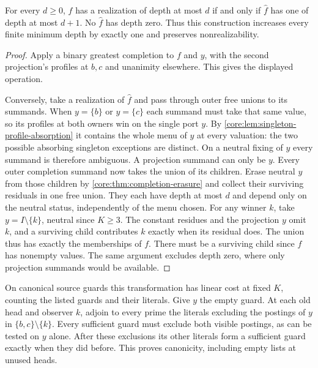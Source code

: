 \begin{theorem}\label{core:thm:completion-suspension}
For every $d\ge0$, $f$ has a realization of depth at most $d$ if and
only if $\widehat f$ has one of depth at most $d+1$.
No $\widehat f$ has depth zero. Thus this construction increases every
finite minimum depth by exactly one and preserves nonrealizability.
\end{theorem}
\begin{proof}
Apply a binary greatest completion to $f$ and $y$, with the second
projection's profiles at $b,c$ and unanimity elsewhere. This gives
the displayed operation.

Conversely, take a realization of $\widehat f$ and pass through outer
free unions to its summands. When $y=\{b\}$ or $y=\{c\}$ each summand
must take that same value, so its profiles at both owners win on the
single port $y$. By \cref{core:lem:singleton-profile-absorption} it
contains the whole menu of $y$ at every valuation: the two possible
absorbing singleton exceptions are distinct. On a neutral fixing of
$y$ every summand is therefore ambiguous. A projection summand can
only be $y$. Every outer completion summand now takes the union of its
children. Erase neutral $y$ from those children by
\cref{core:thm:completion-erasure} and collect their surviving
residuals in one free union. They each have depth at most $d$ and
depend only on the neutral status, independently of the menu chosen.
For any winner $k$, take $y=I\setminus\{k\}$, neutral since $K\ge3$.
The constant residues and the projection $y$ omit $k$, and a surviving
child contributes $k$ exactly when its residual does. The union thus
has exactly the memberships of $f$. There must be a surviving child
since $f$ has nonempty values. The same argument excludes depth zero,
where only projection summands would be available.
\end{proof}

On canonical source guards this transformation has linear cost at
fixed $K$, counting the listed guards and their literals. Give $y$ the
empty guard. At each old head and observer $k$, adjoin to every prime
the literals excluding the postings of $y$ in $\{b,c\}\setminus\{k\}$.
Every sufficient guard must exclude both visible postings, as can be
tested on $y$ alone. After these exclusions its other literals form
a sufficient guard exactly when they did before. This proves
canonicity, including empty lists at unused heads.

